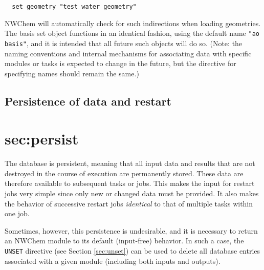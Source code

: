 \begin{verbatim}
  set geometry "test water geometry"
\end{verbatim}

NWChem will automatically check for such indirections when loading
geometries.  The basis set object functions in an identical fashion,
using the default name \verb+"ao basis"+, and it is intended that all
future such objects will do so.  (Note: the naming conventions and
internal mechanisms for associating data with specific modules or
tasks is expected to change in the future, but the directive for
specifying names should remain the same.)

\subsection{Persistence of data and restart}
\section{sec:persist}

The database is persistent, meaning that all input data and results
that are not destroyed in the course of execution are permanently
stored.  These data are therefore available to subsequent tasks or
jobs.  This makes the input for restart jobs very simple since only
new or changed data must be provided.  It also makes the behavior of
successive restart jobs {\em identical} to that of multiple tasks
within one job.  

Sometimes, however, this persistence is undesirable, and it is
necessary to return an NWChem module to its default (input-free)
behavior. In such a case, the \verb+UNSET+ directive (see Section
\ref{sec:unset}) can be used to delete all database entries associated
with a given module (including both inputs and outputs).


